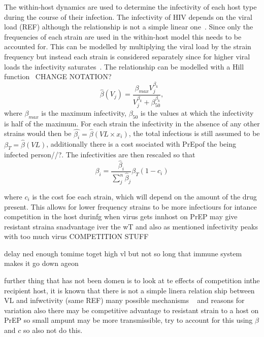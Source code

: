 \documentclass[DIV=15]{scrartcl}
\begin{document}
The within-host dynamics are used to determine the infectivity of each host type during the course of their infection. The infectivity of HIV depends on the viral load (REF) although the relationship is not a simple  linear one~\cite{fraser2007}. Since only the  frequencies of each strain are used in the within-host model this needs to be accounted for. This can be modelled by multiplying the viral load by the strain frequency but instead each strain is considered separately since for higher viral loads the infectivity saturates~\cite{fraser2007}.  The relationship can be modelled with a Hill function~\cite{shirreff2011} 
CHANGE NOTATION?
\begin{equation*}
\hat{\beta}(V_j) = \frac{\beta_{max}V_j^{\beta_k}}{V_j^{\beta_k} + \beta_{50}^{\beta_k}},
\end{equation*}
where $ \beta_{max}$ is the maximum infectivity, $\beta_{50}$ is the values at which the infectivity is half of the maximum.
For each strain the infectivity in the absence of any other strains would then be 
$\hat{\beta_i} =  \hat{\beta}(VL \times x_i)$, the total infectious is still assumed to be $\beta_T = \hat{\beta}(VL)$, additionally there is a cost ssociated with PrEpof the being infected person//?. The infectivities are then rescaled so  that 
\begin{equation*}
\beta_i = \frac{\hat{\beta}_i}{\sum_j^n\hat{\beta}_j }\beta_T(1-c_i)
\end{equation*}


  where $c_i $ is the cost foe  each strain, which will depend on the amount of  the drug present. This allows for lower frequency strains to be more infectiours for intance competition in the host durinfg   when virus gets innhost on PrEP  may give resistant straina snadvantage iver the wT and also as mentioned infectivity peaks with too much virus COMPETITION STUFF
  
  delay ned enough tomime toget high vl but not so long that immune system makes it go down ageon

 further thing that has not been domen is to look at te effects of competition inthe recipient host, it is known that there is not a simple linera relation ship between VL and infwctivity (same REF) 
many possible mechanisms ~\cite{fraser2014,gupta2006,wagner2012,joseph2015} and reasons for variation also there may be competitive advantage to resistant strain to  a host on PrEP  so small ampunt may be more transmissible, try to account for this using $\beta $ and $c$ so also not do this.
\end{document}
